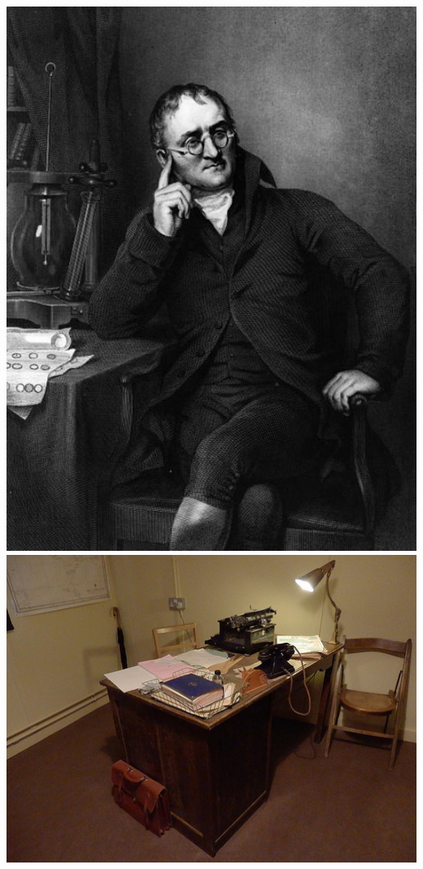 \documentclass[]{book}
\theoremstyle{definition}
\theoremstyle{definition}
\theoremstyle{definition}
\theoremstyle{remark}
\begin{document}
\includegraphics[width=6.28in]{imgs/Dalton_John_desk}
\includegraphics[width=6.94in]{imgs/alan_turing_desk}
\end{document}
